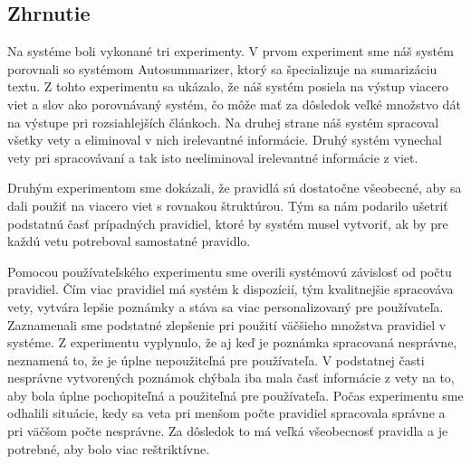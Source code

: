 \subsection{Zhrnutie}
Na systéme boli vykonané tri experimenty. V prvom experiment sme náš systém porovnali so systémom Autosummarizer, ktorý sa špecializuje na sumarizáciu textu. Z tohto experimentu sa ukázalo, že náš systém posiela na výstup viacero viet a slov ako porovnávaný systém, čo môže mať za dôsledok veľké množstvo dát na výstupe pri rozsiahlejších článkoch. Na druhej strane náš systém spracoval všetky vety a eliminoval v nich irelevantné informácie. Druhý systém vynechal vety pri spracovávaní a tak isto neeliminoval irelevantné informácie z viet.

Druhým experimentom sme dokázali, že pravidlá sú dostatočne všeobecné, aby sa dali použiť na viacero viet s rovnakou štruktúrou. Tým sa nám podarilo ušetriť podstatnú časť prípadných pravidiel, ktoré by systém musel vytvoriť, ak by pre každú vetu potreboval samostatné pravidlo.

Pomocou používateľského experimentu sme overili systémovú závislosť od počtu pravidiel. Čím viac pravidiel má systém k dispozícií, tým kvalitnejšie spracováva vety, vytvára lepšie poznámky a stáva sa viac personalizovaný pre používateľa. Zaznamenali sme podstatné zlepšenie pri použití väčšieho množstva pravidiel v systéme. Z experimentu vyplynulo, že aj keď je poznámka spracovaná nesprávne, neznamená to, že je úplne nepoužiteľná pre používateľa. V podstatnej časti nesprávne vytvorených poznámok chýbala iba mala časť informácie z vety na to, aby bola úplne pochopiteľná a použiteľná pre používateľa. Počas experimentu sme odhalili situácie, kedy sa veta pri menšom počte pravidiel spracovala správne a pri väčšom počte nesprávne. Za dôsledok to má veľká všeobecnosť pravidla a je potrebné, aby bolo viac reštriktívne.